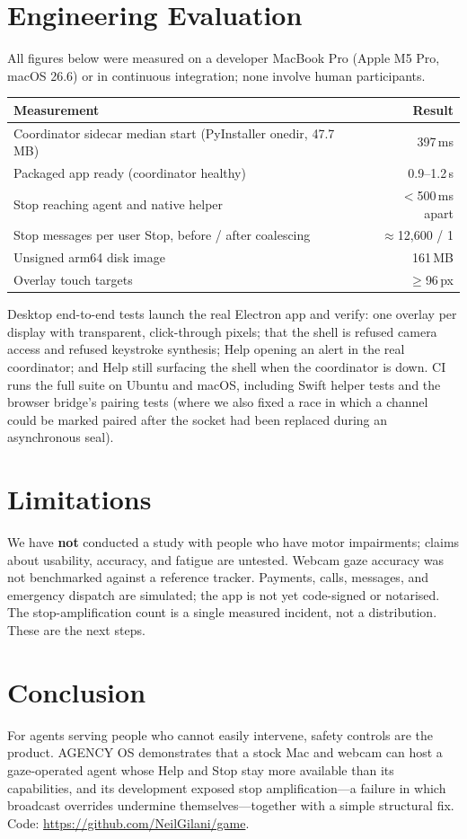 \documentclass[11pt]{article}
\begin{document}
\section{Engineering Evaluation}\label{sec:eval}
All figures below were measured on a developer MacBook Pro (Apple M5 Pro, macOS 26.6) or in continuous integration; none involve human participants.
\begin{center}
\begin{tabular}{@{}lr@{}}
\toprule
Measurement & Result \\
\midrule
Coordinator sidecar median start (PyInstaller onedir, 47.7\,MB) & 397\,ms \\
Packaged app ready (coordinator healthy) & 0.9--1.2\,s \\
Stop reaching agent and native helper & $<$500\,ms apart \\
Stop messages per user Stop, before / after coalescing & $\approx$12{,}600 / 1 \\
Unsigned arm64 disk image & 161\,MB \\
Overlay touch targets & $\ge$96\,px \\
\bottomrule
\end{tabular}
\end{center}
Desktop end-to-end tests launch the real Electron app and verify: one overlay per display with transparent, click-through pixels; that the shell is refused camera access and refused keystroke synthesis; Help opening an alert in the real coordinator; and Help still surfacing the shell when the coordinator is down. CI runs the full suite on Ubuntu and macOS, including Swift helper tests and the browser bridge's pairing tests (where we also fixed a race in which a channel could be marked paired after the socket had been replaced during an asynchronous seal).

\section{Limitations}\label{sec:limits}
We have \textbf{not} conducted a study with people who have motor impairments; claims about usability, accuracy, and fatigue are untested. Webcam gaze accuracy was not benchmarked against a reference tracker. Payments, calls, messages, and emergency dispatch are simulated; the app is not yet code-signed or notarised. The stop-amplification count is a single measured incident, not a distribution. These are the next steps.

\section{Conclusion}
For agents serving people who cannot easily intervene, safety controls are the product. \textsc{AGENCY OS} demonstrates that a stock Mac and webcam can host a gaze-operated agent whose Help and Stop stay more available than its capabilities, and its development exposed stop amplification---a failure in which broadcast overrides undermine themselves---together with a simple structural fix. Code: \url{https://github.com/NeilGilani/game}.
\end{document}
